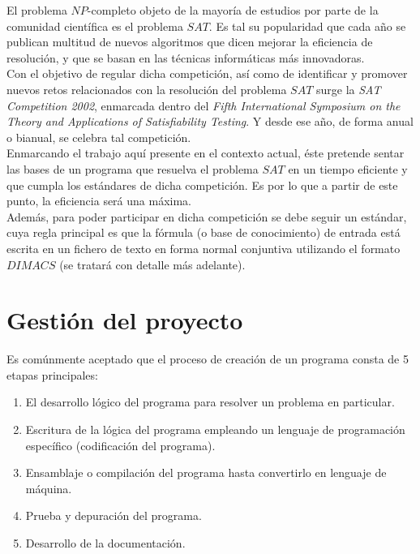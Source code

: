 El problema $NP$-completo objeto de la mayoría de estudios por parte de la comunidad científica es el problema $SAT$. Es tal su popularidad que cada año se publican multitud de nuevos algoritmos que dicen mejorar la eficiencia de resolución, y que se basan en las técnicas informáticas más innovadoras. \\

Con el objetivo de regular dicha competición, así como de identificar y promover nuevos retos relacionados con la resolución del problema $SAT$ surge la \textit{SAT Competition 2002}, enmarcada dentro del \textit{Fifth  International Symposium on the Theory and Applications of Satisfiability Testing}. Y desde ese año, de forma anual o bianual, se celebra tal competición. \\

Enmarcando el trabajo aquí presente en el contexto actual, éste pretende sentar las bases de un programa que resuelva el problema $SAT$ en un tiempo eficiente y que cumpla los estándares de dicha competición. Es por lo que a partir de este punto, la eficiencia será una máxima.\\

 Además, para poder participar en dicha competición se debe seguir un estándar, cuya regla principal es que la fórmula (o base de conocimiento) de entrada está escrita en un fichero de texto en forma normal conjuntiva utilizando el formato $DIMACS$ (se tratará con detalle más adelante).

\newpage

\section{Gestión del proyecto}
Es comúnmente aceptado que el proceso de creación de un programa consta de 5 etapas principales:

\begin{enumerate}
\item El desarrollo lógico del programa para resolver un problema en particular.
\item Escritura de la lógica del programa empleando un lenguaje de programación específico (codificación del programa).
\item Ensamblaje o compilación del programa hasta convertirlo en lenguaje de máquina.
\item Prueba y depuración del programa.
\item Desarrollo de la documentación.
\end{enumerate}

